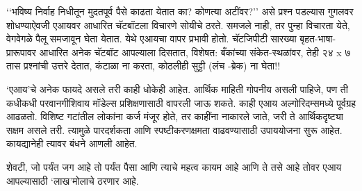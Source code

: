 ‘‘भविष्य निर्वाह निधीतून मुदतपूर्व पैसे काढता येतात का? कोणत्या अटींवर?’’ असे प्रश्न पडल्यास गुगलवर शोधण्याऐवजी एआयवर आधारित चॅटबॉटला विचारणे सोयीचे ठरते. समजले नाही, तर पुन्हा विचारता येते, वेगवेगळे पैलू समजावून घेता येतात. येथे एआयचा वापर प्रभावी होतो. चॅटजिपीटी सारख्या बृहत-भाषा-प्रारूपावर आधारित अनेक चॅटबॉट आपल्याला दिसतात, विशेषत: बँकांच्या संकेत-स्थळांवर, तेही २४ x ७ तास प्रश्नांची उत्तरे देतात, कंटाळा ना करता, कोठलीही सुट्टी (लंच -ब्रेक) ना घेता!!

‘एआय’चे अनेक फायदे असले तरी काही धोकेही आहेत. आर्थिक माहिती गोपनीय असली पाहिजे, पण ती कधीकधी परवानगीशिवाय मॉडेल्स प्रशिक्षणासाठी वापरली जाऊ शकते. काही एआय अल्गोरिदम्समध्ये पूर्वग्रह आढळतो. विशिष्ट गटांतील लोकांना कर्ज मंजूर होते, तर काहींना नाकारले जाते, जरी ते आर्थिकदृष्ट्या सक्षम असले तरी. त्यामुळे पारदर्शकता आणि स्पष्टीकरणक्षमता वाढवण्यासाठी उपाययोजना सुरू आहेत. कायद्यानेही त्यावर बंधने आणली आहेत.

शेवटी, जो पर्यंत जग आहे तो पर्यंत पैसा आणि त्याचे महत्व कायम आहे आणि ते तसे आहे तोवर एआय आपल्यासाठी ‘लाख’मोलाचे ठरणार आहे.